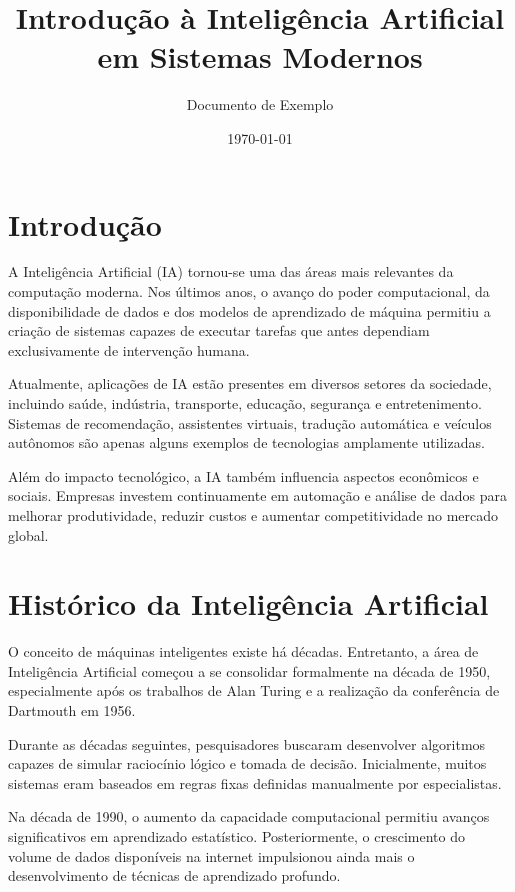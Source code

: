 \documentclass[11pt]{article}
\begin{document}
\title{Introdução à Inteligência Artificial em Sistemas Modernos}
\author{Documento de Exemplo}
\date{\today}
 
\maketitle

\tableofcontents
   
\newpage  

\section{Introdução}

A Inteligência Artificial (IA) tornou-se uma das áreas mais relevantes da computação moderna.
Nos últimos anos, o avanço do poder computacional, da disponibilidade de dados e dos modelos
de aprendizado de máquina permitiu a criação de sistemas capazes de executar tarefas que
antes dependiam exclusivamente de intervenção humana.

Atualmente, aplicações de IA estão presentes em diversos setores da sociedade, incluindo saúde,
indústria, transporte, educação, segurança e entretenimento. Sistemas de recomendação,
assistentes virtuais, tradução automática e veículos autônomos são apenas alguns exemplos
de tecnologias amplamente utilizadas.

Além do impacto tecnológico, a IA também influencia aspectos econômicos e sociais. Empresas
investem continuamente em automação e análise de dados para melhorar produtividade,
reduzir custos e aumentar competitividade no mercado global. 

\section{Histórico da Inteligência Artificial}

O conceito de máquinas inteligentes existe há décadas. Entretanto, a área de Inteligência
Artificial começou a se consolidar formalmente na década de 1950, especialmente após os
trabalhos de Alan Turing e a realização da conferência de Dartmouth em 1956.

Durante as décadas seguintes, pesquisadores buscaram desenvolver algoritmos capazes de
simular raciocínio lógico e tomada de decisão. Inicialmente, muitos sistemas eram baseados em
regras fixas definidas manualmente por especialistas.

Na década de 1990, o aumento da capacidade computacional permitiu avanços significativos em
aprendizado estatístico. Posteriormente, o crescimento do volume de dados disponíveis na
internet impulsionou ainda mais o desenvolvimento de técnicas de aprendizado profundo.
\end{document}
